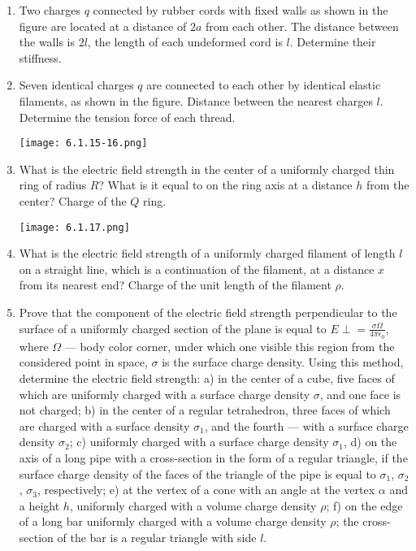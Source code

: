 \documentclass{article}
\begin{document}
\begin{enumerate}[label=6.1.\arabic*]
\item Two charges $q$ connected by rubber cords with fixed walls as shown in the figure are located at a distance of $2a$ from each other. The distance between the walls is $2l$, the length of each undeformed cord is $l$. Determine their stiffness.

\item Seven identical charges $q$ are connected to each other by identical elastic filaments, as shown in the figure. Distance between the nearest charges $l$. Determine the tension force of each thread.

\begin{center}
    \texttt{[image: 6.1.15-16.png]}
\end{center}

\item What is the electric field strength in the center of a uniformly charged thin ring of radius $R$? What is it equal to on the ring axis at a distance $h$ from the center? Charge of the $Q$ ring.

\begin{center}
    \texttt{[image: 6.1.17.png]}
\end{center}

\item What is the electric field strength of a uniformly charged filament of length $l$ on a straight line, which is a continuation of the filament, at a distance $x$ from its nearest end? Charge of the unit length of the filament $\rho$.

\item Prove that the component of the electric field strength perpendicular to the surface of a uniformly charged section of the plane is equal to $E\perp = \frac{\sigma \Omega}{4\pi \epsilon_0}$, where $\Omega$ — body color corner, under which one visible this region from the considered point in space, $\sigma$ is the surface charge density. Using this method, determine the electric field strength: a) in the center of a cube, five faces of which are uniformly charged with a surface charge density $\sigma$, and one face is not charged; b) in the center of a regular tetrahedron, three faces of which are charged with a surface density $\sigma_1$, and the fourth — with a surface charge density $\sigma_2$; c) uniformly charged with a surface charge density $\sigma_1$, d) on the axis of a long pipe with a cross-section in the form of a regular triangle, if the surface charge density of the faces of the triangle of the pipe is equal to $\sigma_1$, $\sigma_2$, $\sigma_3$, respectively; e) at the vertex of a cone with an angle at the vertex $\alpha$ and a height $h$, uniformly charged with a volume charge density $\rho$; f) on the edge of a long bar uniformly charged with a volume charge density $\rho$; the cross-section of the bar is a regular triangle with side $l$.


\end{enumerate}
\end{document}
